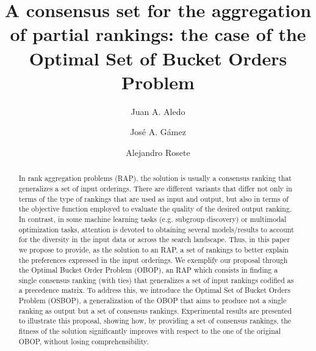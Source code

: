\documentclass[preprint,12pt]{article}
\theoremstyle{definition}
\theoremstyle{remark}
\theoremstyle{example} %
\begin{document}
\title{A consensus set for the aggregation of partial rankings: the case of the Optimal Set of Bucket Orders Problem}


\date{}

\author[1]{Juan A. Aledo} %



\author[2]{Jos\'e A. G\'amez}


\author[3,4]{Alejandro Rosete } 


            
\maketitle 

\newpage

\begin{abstract}
In rank aggregation problems (RAP), the solution is usually  a  consensus ranking that generalizes a set of input orderings. There are different variants that differ not only in terms of the type of rankings that are used as input and output, but also in terms of the objective function employed to evaluate the quality of the desired output ranking. In contrast, in some machine learning tasks (e.g. subgroup discovery) or multimodal optimization tasks, attention is devoted to obtaining several models/results  to account for the diversity in the input data or across the search landscape. Thus, in this paper we propose to provide, as the solution to an RAP, a set of rankings to better explain the preferences expressed in the input orderings. We exemplify our proposal through the Optimal Bucket Order Problem (OBOP), an RAP which consists in
finding a single consensus ranking (with ties) that generalizes a set of input rankings codified as a precedence matrix. To address this, we introduce the Optimal Set of Bucket Orders Problem (OSBOP), a generalization of the OBOP that aims to produce not a single ranking as output but a set of consensus rankings. 
Experimental results are presented to illustrate this proposal, showing how, by providing a set of consensus rankings, the fitness of the solution significantly improves with respect to the one of the original OBOP, without losing  comprehensibility. 
\end{abstract}
\end{document}
